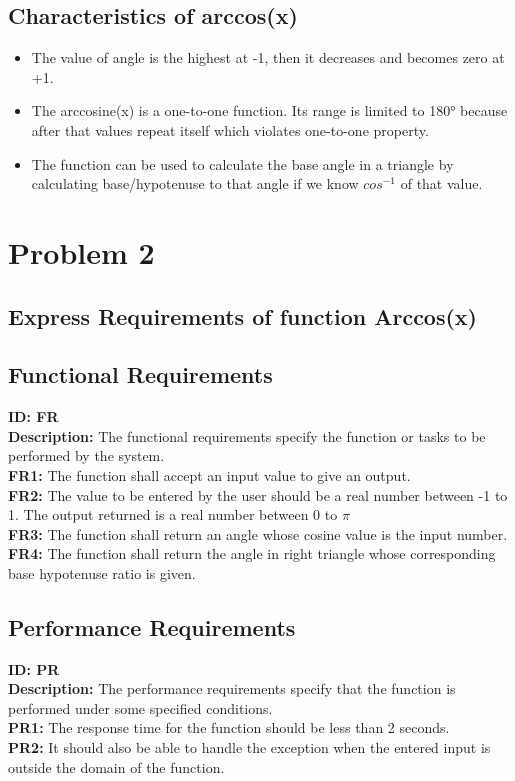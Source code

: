 \documentclass[12pt]{article}
\begin{document}
\subsection{Characteristics of arccos(x)}
\begin{itemize} %
  \item The value of angle is the highest at -1, then it decreases and becomes zero at +1.
  \item The arccosine(x) is a one-to-one function. Its range is limited to 180° because after that values repeat itself which violates one-to-one property.
  \item The function can be used to calculate the base angle in a triangle by calculating base/hypotenuse to that angle if we know $cos^{-1}$ of that value.
\end{itemize}

\section{Problem 2}
\subsection*{Express Requirements of function Arccos(x)}
\subsection{Functional Requirements}
\textbf{ID: FR}\\
\textbf{Description: }The functional requirements specify the function or tasks to be performed by the system.\\ 
	\textbf{FR1: }The function shall accept an input value to give an output.\\
	\textbf{FR2: }The value to be entered by the user should be a real number between -1 to 1. The output returned is a real number between 0 to $\pi$\\
	\textbf{FR3: }The function shall return an angle whose cosine value is the input number.\\
	\textbf{FR4: }The function shall return the angle in right triangle whose corresponding base hypotenuse ratio is given.
	
\subsection{Performance Requirements}
\textbf{ID: PR}\\
\textbf{Description: }The performance requirements specify that the function is performed under some specified conditions.\\
\textbf{PR1: }The response time for the function should be less than 2 seconds.\\
	\textbf{PR2: }It should also be able to handle the exception when the entered input is outside the domain of the function.
\end{document}
